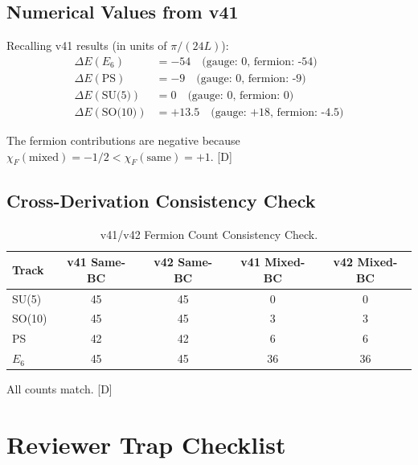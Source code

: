 \documentclass[11pt,a4paper]{article}
\newcommand{\tagD}{\textcolor{blue!70!black}{[D]}}
\begin{document}
\subsection{Numerical Values from v41}

Recalling v41 results (in units of $\pi/(24L)$):
\begin{align}
\label{eq:v41-e6}
\Delta E(E_6) &= -54 \quad \text{(gauge: 0, fermion: -54)} \\
\label{eq:v41-ps}
\Delta E(\text{PS}) &= -9 \quad \text{(gauge: 0, fermion: -9)} \\
\label{eq:v41-su5}
\Delta E(\text{SU(5)}) &= 0 \quad \text{(gauge: 0, fermion: 0)} \\
\label{eq:v41-so10}
\Delta E(\text{SO(10)}) &= +13.5 \quad \text{(gauge: +18, fermion: -4.5)}
\end{align}

The fermion contributions are negative because $\chi_F(\text{mixed}) = -1/2 < \chi_F(\text{same}) = +1$.
\tagD

\subsection{Cross-Derivation Consistency Check}

\begin{table}[h]
\centering
\caption{v41/v42 Fermion Count Consistency Check.}
\label{tab:cross-check}
\begin{tabular}{lcccc}
\toprule
Track & v41 Same-BC & v42 Same-BC & v41 Mixed-BC & v42 Mixed-BC \\
\midrule
SU(5) & 45 & 45 & 0 & 0 \\
SO(10) & 45 & 45 & 3 & 3 \\
PS & 42 & 42 & 6 & 6 \\
$E_6$ & 45 & 45 & 36 & 36 \\
\bottomrule
\end{tabular}
\end{table}

All counts match. \tagD

\section{Reviewer Trap Checklist}
\label{sec:traps}
\end{document}
